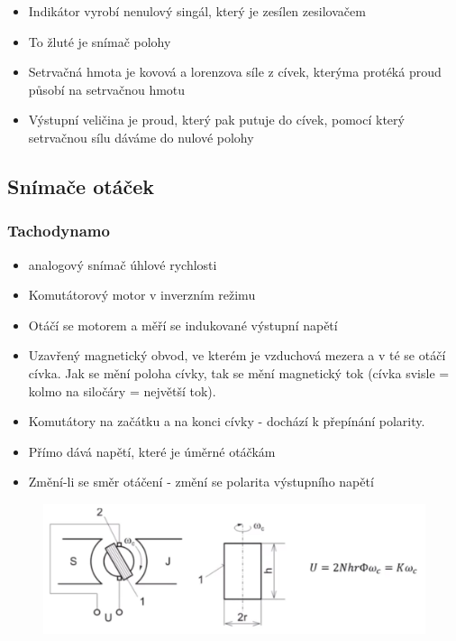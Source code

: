 \begin{itemize}
    \item Indikátor vyrobí nenulový singál, který je zesílen zesilovačem
    \item To žluté je snímač polohy
    \item Setrvačná hmota je kovová a lorenzova síle z cívek, kterýma protéká proud působí na setrvačnou hmotu 
    \item Výstupní veličina je proud, který pak putuje do cívek, pomocí který setrvačnou sílu dáváme do nulové polohy
\end{itemize}

\subsection*{Snímače otáček}
\subsubsection*{Tachodynamo}
\begin{itemize}
    \item analogový snímač úhlové rychlosti
    \item Komutátorový motor v inverzním režimu
    \item Otáčí se motorem a měří se indukované výstupní napětí
    \item Uzavřený magnetický obvod, ve kterém je vzduchová mezera a v té se otáčí cívka. Jak se mění poloha cívky, tak se mění magnetický tok (cívka svisle = kolmo na siločáry = největší tok).
    \item Komutátory na začátku a na konci cívky - dochází k přepínání polarity.
    \item Přímo dává napětí, které je úměrné otáčkám
    \item Změní-li se směr otáčení - změní se polarita výstupního napětí
\end{itemize}

\begin{figure}[h]
    \centering
    \includegraphics[scale = 0.50]{img/TachoRYCH.png}
\end{figure}

